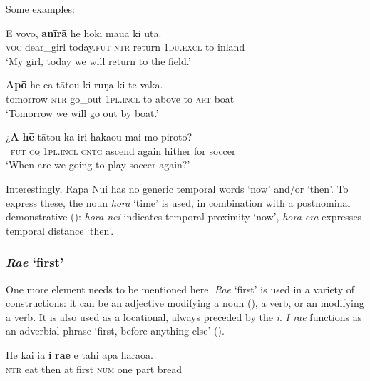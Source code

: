   
Some examples:

\ea\label{ex:3.175}
\gll E vovo, \textbf{{\ꞌ}anīrā} he hoki māua ki {\ꞌ}uta. \\
\textsc{voc} dear\_girl today.\textsc{fut} \textsc{ntr} return \textsc{1du.excl} to inland \\

\glt 
‘My girl, today we will return to the field.’ \textstyleExampleref{[R235.038]} 
\z

\ea\label{ex:3.176}
\gll \textbf{Āpō} he e{\ꞌ}a tātou ki ruŋa ki te vaka. \\
tomorrow \textsc{ntr} go\_out \textsc{1pl.incl} to above to \textsc{art} boat \\

\glt 
‘Tomorrow we will go out by boat.’ \textstyleExampleref{[R368.045]} 
\z

\ea\label{ex:3.177}
\gll ¿\textbf{A} \textbf{hē} tātou ka iri haka{\ꞌ}ou mai mo piroto? \\
~\textsc{fut} \textsc{cq} \textsc{1pl.incl} \textsc{cntg} ascend again hither for soccer \\

\glt
‘When are we going to play soccer again?’ \textstyleExampleref{[R155.007]} 
\z

Interestingly, Rapa Nui has no generic temporal words ‘now’ and/or ‘then’. To express these, the noun \textit{hora} ‘time’ is used, in combination with a postnominal demonstrative (): \textit{hora nei} indicates temporal proximity ‘now’, \textit{hora era} expresses temporal distance ‘then’.

\subsubsection{\textit{Ra{\ꞌ}e} ‘first’}\label{sec:3.6.4.1}
One more element needs to be mentioned here. \textit{Ra{\ꞌ}e} ‘first’ is used in a variety of constructions: it can be an adjective modifying a noun (), a verb, or an  modifying a verb. It is also used as a locational, always preceded by the  \textit{{\ꞌ}i}. \textit{{\ꞌ}I ra{\ꞌ}e} functions as an adverbial phrase ‘first, before anything else’ ().

\ea\label{ex:3.178}
\gll He kai ia \textbf{{\ꞌ}i} \textbf{ra{\ꞌ}e} e tahi {\ꞌ}apa haraoa.\\
\textsc{ntr} eat then at first \textsc{num} one part bread\\


